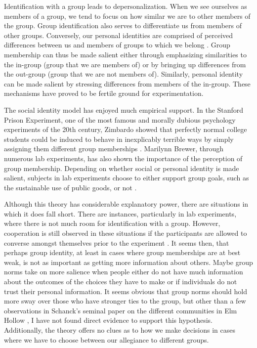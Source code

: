 \documentclass[rutwik_proposal.tex]{subfiles}
\begin{document}
Identification with a group leads to depersonalization. When we see ourselves as members of a group, we tend to focus on how similar we are to other members of the group. Group identification also serves to differentiate us from members of other groups. Conversely, our personal identities are comprised of perceived differences between us and members of groups to which we belong \cite{Brewer91}. Group membership can thus be made salient either through emphasizing similarities to the in-group (group that we are members of) or by bringing up differences from the out-group (group that we are not members of). Similarly, personal identity can be made salient by stressing differences from members of the in-group. These mechanisms have proved to be fertile ground for experimentation.

The social identity model has enjoyed much empirical support. In the Stanford Prison Experiment, one of the most famous and morally dubious psychology experiments of the 20th century, Zimbardo showed that perfectly normal college students could be induced to behave in inexplicably terrible ways by simply assigning them different group memberships \cite{Zimbardo07}. Marilynn Brewer, through numerous lab experiments, has also shown the importance of the perception of group membership. Depending on whether social or personal identity is made salient, subjects in lab experiments choose to either support group goals, such as the sustainable use of public goods, or not \cite{Brewer91, Kramer84, Brewer79}.

Although this theory has considerable explanatory power, there are situations in which it does fall short. There are instances, particularly in lab experiments, where there is not much room for identification with a group. However, cooperation is still observed in these situations if the participants are allowed to converse amongst themselves prior to the experiment \cite{Dawes00}. It seems then, that perhaps group identity, at least in cases where group memberships are at best weak, is not as important as getting more information about others. Maybe group norms take on more salience when people either do not have much information about the outcomes of the choices they have to make or if individuals do not trust their personal information. It seems obvious that group norms should hold more sway over those who have stronger ties to the group, but other than a few observations in Schanck's seminal paper on the different communities in Elm Hollow \cite{Schanck32}, I have not found direct evidence to support this hypothesis. Additionally, the theory offers no clues as to how we make decisions in cases where we have to choose between our allegiance to different groups.
\end{document}
